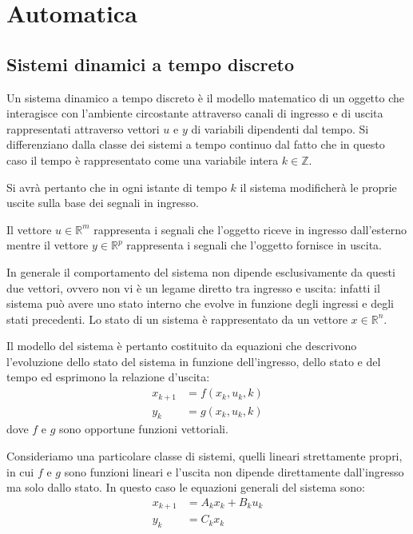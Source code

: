 \section{Automatica}
\subsection{Sistemi dinamici a tempo discreto}

Un sistema dinamico a tempo discreto è il modello matematico di un oggetto che interagisce con l’ambiente circostante attraverso canali di ingresso e di uscita rappresentati attraverso vettori $u$ e $y$ di variabili dipendenti dal tempo. Si differenziano dalla classe dei sistemi a tempo continuo dal fatto che in questo caso il tempo è rappresentato come una variabile intera $k \in \mathbb{Z}$.

Si avrà pertanto che in ogni istante di tempo $k$ il sistema modificherà le proprie uscite sulla base dei segnali in ingresso.

Il vettore $u \in \mathbb{R}^m$ rappresenta i segnali che l’oggetto riceve in ingresso dall’esterno mentre il vettore $y \in \mathbb{R}^p$ rappresenta i segnali che l’oggetto fornisce in uscita.

In generale il comportamento del sistema non dipende esclusivamente da questi due vettori, ovvero non vi è un legame diretto tra ingresso e uscita: infatti il sistema può avere uno stato interno che evolve in funzione degli ingressi e degli stati precedenti. Lo stato di un sistema è rappresentato da un vettore $x \in \mathbb{R}^n$.

Il modello del sistema è pertanto costituito da equazioni che descrivono l’evoluzione dello stato del sistema in funzione dell’ingresso, dello stato e del tempo ed esprimono la relazione d'uscita:
\begin{subequations}
\begin{align}
x_{k+1} &= f(x_k,u_k,k) \\
y_k &= g(x_k,u_k,k)
\end{align}
\end{subequations}
dove $f$ e $g$ sono opportune funzioni vettoriali.



Consideriamo una particolare classe di sistemi, quelli lineari strettamente propri, in cui $f$ e $g$ sono funzioni lineari e l’uscita non dipende direttamente dall’ingresso ma solo dallo stato. In questo caso le equazioni generali del sistema sono:
\begin{subequations}
\begin{align}
x_{k+1} &= A_kx_k + B_ku_k \\
y_k &= C_kx_k
\end{align}
\end{subequations}

